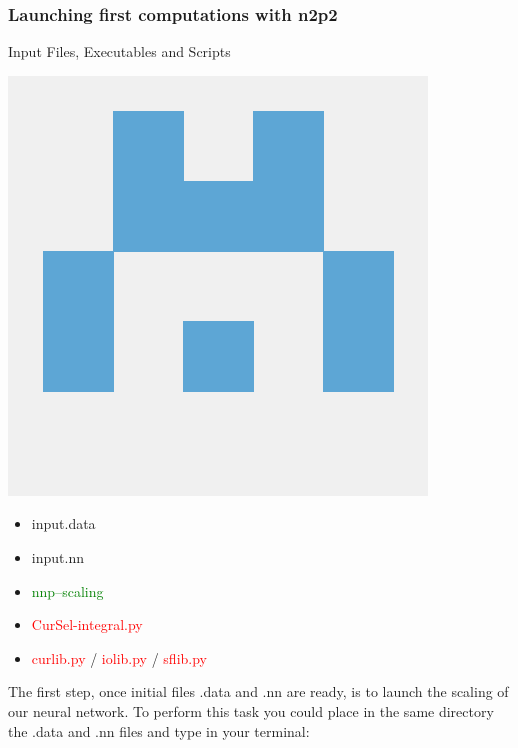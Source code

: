 \documentclass[12pt]{article}
\begin{document}
\subsubsection{Launching first computations with n2p2}
\begin{mybox2}{{Input Files, Executables and Scripts}}
\begin{minipage}[c]{0.5\linewidth}
\includegraphics[scale=0.1]{n2p2.png}
\end{minipage}
\begin{minipage}[c]{0.5\linewidth}
\begin{itemize}
    \item input.data
    \item input.nn
    \item \textcolor{green}{nnp--scaling}
    \item \textcolor{red}{CurSel-integral.py}
    \item \textcolor{red}{curlib.py} / \textcolor{red}{iolib.py} / \textcolor{red}{sflib.py}
\end{itemize}
\end{minipage}
\end{mybox2}
The first step, once initial files .data and .nn are ready, is to launch the scaling of our neural network. To perform this task you could place in the same directory the .data and .nn files and type in your terminal:
\begin{center}
\end{center}
\end{document}
